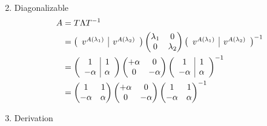 \documentclass[12pt]{article}
\begin{document}
\begin{enumerate}
\begin{enumerate}
\begin{align}
		            \end{align}
	      \end{enumerate}
	\item Diagonalizable
	      \begin{align}
		      A & = T\Lambda T^{-1}\notag            \\
		        & =
		      \begin{pmatrix}\begin{array}{c|c} v^{A(\lambda_{1})} & v^{A(\lambda_{2})}\end{array}\end{pmatrix}
		      \begin{pmatrix} \lambda_{1} &0 \\ 0&\lambda_{2}\end{pmatrix}
		      \begin{pmatrix}\begin{array}{c|c} v^{A(\lambda_{1})} & v^{A(\lambda_{2})}\end{array}\end{pmatrix}^{-1}\notag \\
		        & =
		      \begin{pmatrix}\begin{array}{c|c} 1 & 1\\ -\alpha&\alpha \end{array}\end{pmatrix}
		      \begin{pmatrix} +\alpha &0 \\ 0&-\alpha\end{pmatrix}
		      \begin{pmatrix}\begin{array}{c|c} 1 & 1\\ -\alpha&\alpha \end{array}\end{pmatrix}^{-1}\notag \\
		        & =
		      \begin{pmatrix} 1 & 1\\ -\alpha&\alpha \end{pmatrix}
		      \begin{pmatrix} +\alpha &0 \\ 0&-\alpha\end{pmatrix}
		      \begin{pmatrix} 1 & 1\\ -\alpha&\alpha \end{pmatrix}^{-1}\notag 
	      \end{align}
	\item Derivation

\end{enumerate}
\end{document}
